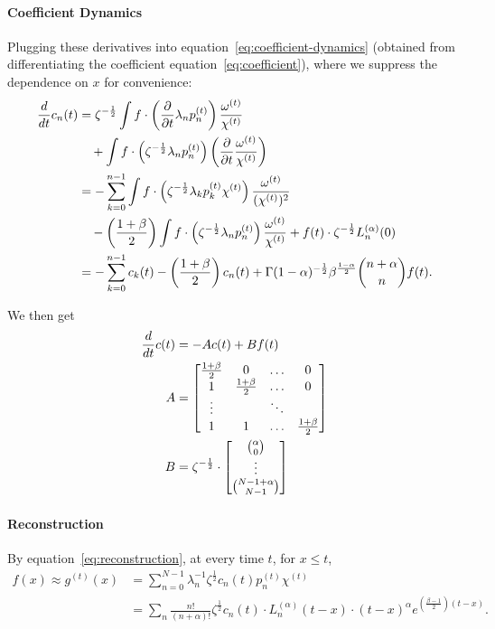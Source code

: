 \documentclass[../../hippo]{subfiles}
\begin{document}
\paragraph{Coefficient Dynamics}
Plugging these derivatives into equation~\eqref{eq:coefficient-dynamics} (obtained from differentiating the coefficient equation~\eqref{eq:coefficient}), where we suppress the dependence on $x$ for convenience:
\begin{align*}
  \frac{d}{d t} c_n(t)
  &= \zeta^{-\frac{1}{2}} \int f \cdot \left(\frac{\partial}{\partial t} \lambda_n p_n^{(t)}\right) \frac{\omega^{(t)}}{\chi^{(t)}}
  \\&\quad + \int f \cdot \left( \zeta^{-\frac{1}{2}} \lambda_n p_n^{(t)} \right) \left( \frac{\partial}{\partial t} \frac{\omega^{(t)}}{\chi^{(t)}} \right)
  \\
  &= -\sum_{k=0}^{n-1} \int f \cdot \left( \zeta^{-\frac{1}{2}} \lambda_k p_k^{(t)} \chi^{(t) }\right) \frac{\omega^{(t)}}{(\chi^{(t)})^2}
  \\&\quad - \left( \frac{1+\beta}{2} \right) \int f \cdot \left( \zeta^{-\frac{1}{2}} \lambda_n p_n^{(t)} \right) \frac{\omega^{(t)}}{\chi^{(t)}} + f(t) \cdot \zeta^{-\frac{1}{2}} L_n^{(\alpha)}(0)
  \\
  &= -\sum_{k=0}^{n-1} c_k(t) - \left( \frac{1+\beta}{2} \right) c_n(t) + \Gamma(1-\alpha)^{-\frac{1}{2}} \beta^{\frac{1-\alpha}{2}} \binom{n+\alpha}{n} f(t).
\end{align*}

We then get
\begin{equation}
  \begin{aligned}
    \frac{d}{d t} c(t)
    &= -A c(t) + B f(t)
    \\
    A &=
    \begin{bmatrix}
      \frac{1+\beta}{2} & 0 & \dots & 0 \\
      1 & \frac{1+\beta}{2} & \dots & 0 \\
      \vdots & & \ddots & \\
      1 & 1 & \dots & \frac{1+\beta}{2}
    \end{bmatrix}
    \\
    B &= \zeta^{-\frac{1}{2}} \cdot \begin{bmatrix} \binom{\alpha}{0} \\ \vdots \\ \binom{N-1+\alpha}{N-1} \end{bmatrix}
  \end{aligned}
\end{equation}

\paragraph{Reconstruction}
By equation~\eqref{eq:reconstruction}, at every time $t$, for $x \leq t$,
\begin{align*}
  f(x) \approx g^{(t)}(x)
  &= \sum_{n=0}^{N-1} \lambda_n^{-1} \zeta^{\frac{1}{2}} c_n(t) p_n^{(t)} \chi^{(t)}
  \\
  &= \sum_n \frac{n!}{(n+\alpha)!} \zeta^{\frac{1}{2}} c_n(t) \cdot L^{(\alpha)}_n(t-x) \cdot (t-x)^\alpha e^{\left( \frac{\beta-1}{2} \right)(t-x)}.
\end{align*}
\end{document}
